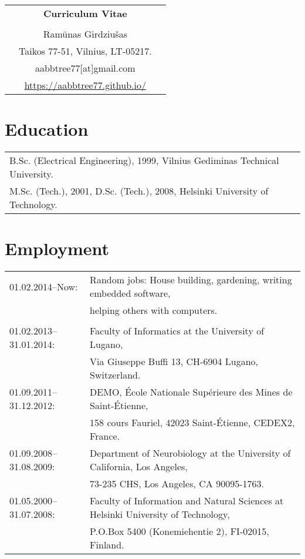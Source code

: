 \documentclass[a4paper,11pt]{article}
\begin{document}

%
%
\begin{center}
\begin{tabular}{ccc}
&\Large \textbf{Curriculum Vitae}&\\
\\
& Ram\={u}nas Girdziu\v{s}as &\\  
& Taikos 77-51, Vilnius, LT-05217. &\\
& aabbtree77[at]gmail.com &\\
& \url{https://aabbtree77.github.io/}
\end{tabular}
\end{center}
%
\section{Education}
%
\begin{tabular}{ll}
        B.Sc. (Electrical Engineering), 1999, Vilnius Gediminas Technical University.\\
        M.Sc. (Tech.), 2001, D.Sc. (Tech.), 2008, Helsinki University of Technology.
\end{tabular}
%
\section{Employment}
%
\begin{tabular}{ll}
01.02.2014--Now:        & Random jobs: House building, gardening, writing embedded software, \\
                        & helping others with computers.\\  
                        & \\
01.02.2013--31.01.2014: & Faculty of Informatics at the University of Lugano,\\
                        & Via Giuseppe Buffi 13, CH-6904 Lugano, Switzerland. 
\\
01.09.2011--31.12.2012: & DEMO, \'{E}cole Nationale Sup\'{e}rieure des Mines de Saint-\'{E}tienne,\\
&158 cours Fauriel, 42023 Saint-\'Etienne, CEDEX2, France.
\\
01.09.2008--31.08.2009: & Department of Neurobiology at the University of California, Los Angeles,\\
&73-235 CHS, Los Angeles, CA 90095-1763.
\\
01.05.2000--31.07.2008: & Faculty of Information and Natural Sciences at Helsinki University of Technology,\\ 
&  P.O.Box 5400 (Konemiehentie 2), FI-02015, Finland.
\end{tabular}
\end{document}
